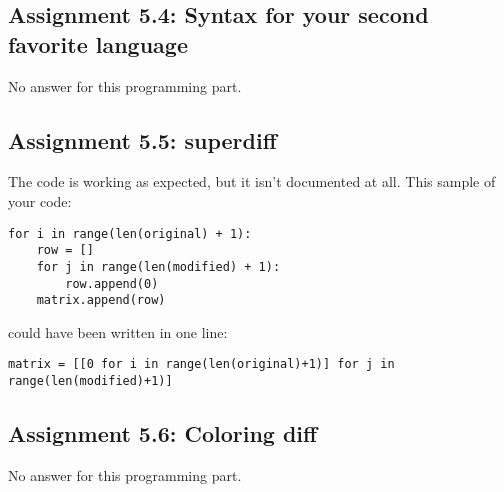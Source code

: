 \documentclass[a4paper]{article}
\begin{document}
\subsection*{Assignment 5.4: Syntax for your second favorite language}
No answer for this programming part.

\subsection*{Assignment 5.5: superdiff}
The code is working as expected, but it isn't documented at all. This sample of your code: \newline
\begin{verbatim}
for i in range(len(original) + 1):
    row = []
    for j in range(len(modified) + 1):
        row.append(0)
    matrix.append(row)
\end{verbatim}
\newline could have been written in one line: \newline
\begin{verbatim}
matrix = [[0 for i in range(len(original)+1)] for j in range(len(modified)+1)]
\end{verbatim}

\subsection*{Assignment 5.6:  Coloring diff}
No answer for this programming part.




\end{document}
